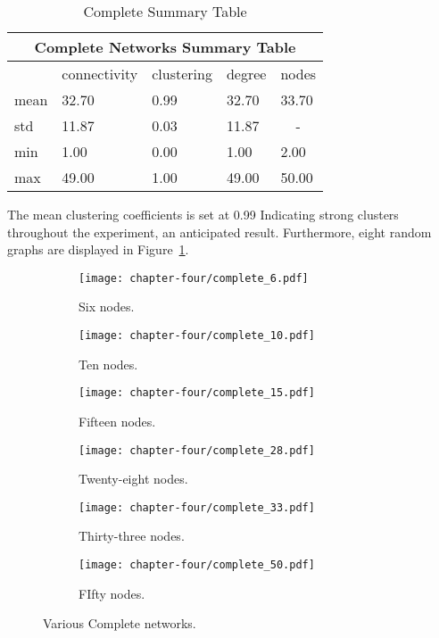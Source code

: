 \begin{table}[!hbtp]
	\centering
	\begin{adjustbox}{width=0.5\textwidth}
		\small
		\begin{tabular}{|l|l|l|l|l|}
			\hline
			\multicolumn{5}{|c|}{Complete Networks Summary Table}                     \\ \hline
			     & connectivity & clustering & degree & nodes                  \\ \hline
			mean & 32.70        & 0.99       & 32.70  & 33.70                  \\ \hline
			std  & 11.87        & 0.03       & 11.87  & \multicolumn{1}{c|}{-} \\ \hline
			min  & 1.00         & 0.00       & 1.00   & 2.00                   \\ \hline
			max  & 49.00        & 1.00       & 49.00  & 50.00                  \\ \hline
		\end{tabular}
	\end{adjustbox}
	\caption{Complete Summary Table}
	\label{table:complete-summary-table}
\end{table}

The mean clustering coefficients is set at 0.99 Indicating strong clusters
throughout the experiment, an anticipated result. Furthermore, eight random
graphs are displayed in Figure~\ref{complete_networks_illustration}.

\begin{figure}[!hbtp]
	\centering
	\begin{subfigure}[t]{0.30\textwidth}
		\centering
		\texttt{[image: chapter-four/complete\_6.pdf]}
		\caption{Six nodes.}
	\end{subfigure}
	\hfill
	\begin{subfigure}[t]{0.30\textwidth}\centering
		\centering
		\texttt{[image: chapter-four/complete\_10.pdf]}
		\caption{Ten nodes.}
	\end{subfigure}
	\hfill
	\begin{subfigure}[t]{0.30\textwidth}\centering
		\centering
		\texttt{[image: chapter-four/complete\_15.pdf]}
		\caption{Fifteen nodes.}
	\end{subfigure}
	\hfill
	\begin{subfigure}[t]{0.30\textwidth}\centering
		\centering
		\texttt{[image: chapter-four/complete\_28.pdf]}
		\caption{Twenty-eight nodes.}
	\end{subfigure}
	\hfill
	\begin{subfigure}[t]{0.30\textwidth}\centering
		\centering
		\texttt{[image: chapter-four/complete\_33.pdf]}
		\caption{Thirty-three nodes.}
	\end{subfigure}
	\hfill
	\begin{subfigure}[t]{0.30\textwidth}\centering
		\centering
		\texttt{[image: chapter-four/complete\_50.pdf]}
		\caption{FIfty nodes.}
	\end{subfigure}
	\caption{Various Complete networks.}
	\label{complete_networks_illustration}
\end{figure}

